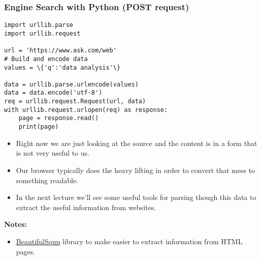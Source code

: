 \documentclass[xcolor=svgnames]{beamer}
\newcommand{\purple}[1]{{\textcolor{purple}{#1}}}
\newcommand{\nl}{\\[1em]}
\newcommand{\ft}[1]{\frametitle{#1}}
\begin{document}
\begin{frame}[fragile]\ft{Engine Search with Python ({\sf POST} request)}
\begin{Verbatim}[fontsize=\small, commandchars=\\\{\} ]
import urllib.parse
import urllib.request

url = 'https://www.ask.com/web'
# Build and encode data
values = \{'q':'data analysis'\} 

data = urllib.parse.urlencode(values)
data = data.encode('utf-8') 
req = urllib.request.Request(url, data)
with urllib.request.urlopen(req) as response:
    page = response.read()
    print(page)
\end{Verbatim}


\end{frame}


\begin{frame}
\begin{itemize}
\item Right now we are just looking at the source and the content is in a form that is not very useful to us.\nl
\item Our browser typically does the heavy lifting in order to convert that mess to something readable.\nl
\item In the next lecture we'll see some useful tools for parsing though this data to extract the useful information from websites.
\end{itemize}
{\bf Notes:}
\begin{itemize}
\item \href{https://www.pythonforbeginners.com/beautifulsoup/beautifulsoup-4-python}{BeautifulSoup} library to make easier to extract information from HTML pages.\end{itemize}

\end{frame}
\end{document}

